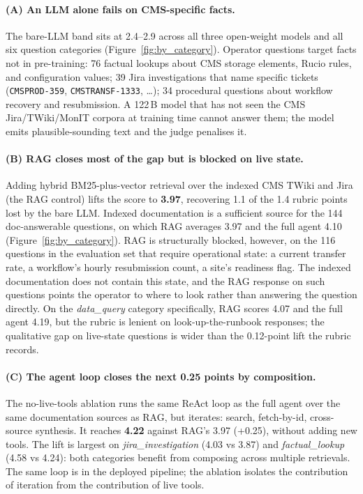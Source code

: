 \paragraph{(A) An LLM alone fails on CMS-specific facts.}
The bare-LLM band sits at 2.4--2.9 across all three open-weight
models and all six question categories
(Figure~\ref{fig:by_category}). Operator questions target facts
not in pre-training: 76 factual lookups about CMS storage
elements, Rucio rules, and configuration values; 39 Jira
investigations that name specific tickets
(\texttt{CMSPROD-359}, \texttt{CMSTRANSF-1333}, \dots); 34
procedural questions about workflow recovery and resubmission.
A 122\,B model that has not seen the CMS Jira/TWiki/MonIT
corpora at training time cannot answer them; the model emits
plausible-sounding text and the judge penalises it.

\paragraph{(B) RAG closes most of the gap but is blocked on
live state.}
Adding hybrid BM25-plus-vector retrieval over the indexed CMS
TWiki and Jira (the RAG control) lifts the score to
\textbf{3.97}, recovering 1.1 of the 1.4 rubric points lost by
the bare LLM. Indexed documentation is a sufficient source for
the 144 doc-answerable questions, on which RAG averages 3.97
and the full agent 4.10 (Figure~\ref{fig:by_category}). RAG is
structurally blocked, however, on the 116 questions in the
evaluation set that require operational state: a current
transfer rate, a workflow's hourly resubmission count, a site's
readiness flag. The indexed documentation does not contain this
state, and the RAG response on such questions points the
operator to where to look rather than answering the question
directly. On the \textit{data\_query} category specifically,
RAG scores 4.07 and the full agent 4.19, but the rubric is
lenient on look-up-the-runbook responses; the qualitative gap
on live-state questions is wider than the 0.12-point lift the
rubric records.

\paragraph{(C) The agent loop closes the next 0.25 points by
composition.}
The no-live-tools ablation runs the same ReAct loop
as the full agent over the same documentation sources as RAG,
but iterates: search, fetch-by-id, cross-source synthesis. It
reaches \textbf{4.22} against RAG's 3.97 (+0.25), without
adding new tools. The lift is largest on
\textit{jira\_investigation} (4.03 vs 3.87) and
\textit{factual\_lookup} (4.58 vs 4.24): both categories
benefit from composing across multiple retrievals. The same
loop is in the deployed pipeline; the ablation isolates the
contribution of iteration from the contribution of live tools.


